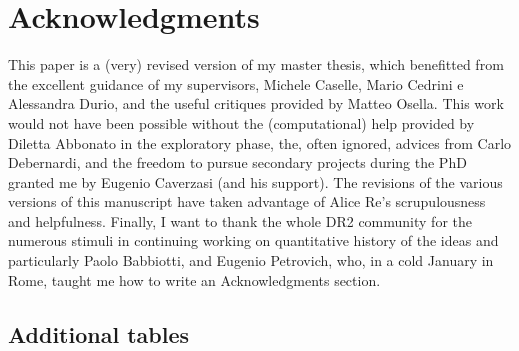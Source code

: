 \documentclass[a4paper, 11pt, headings=standardclasses, tablecaptionsbelow]{scrartcl}
\begin{document}
\section*{Acknowledgments}
This paper is a (very) revised version of my master thesis, which benefitted from the excellent guidance of my supervisors, Michele Caselle, Mario Cedrini e Alessandra Durio, and the useful critiques provided by Matteo Osella.
This work would not have been possible without the (computational) help provided by Diletta Abbonato in the exploratory phase, the, often ignored, advices from Carlo Debernardi, and the freedom to pursue secondary projects during the PhD granted me by Eugenio Caverzasi (and his support).
The revisions of the various versions of this manuscript have taken advantage of Alice Re's scrupulousness and helpfulness.
Finally, I want to thank the whole DR2 community for the numerous stimuli in continuing working on quantitative history of the ideas and particularly Paolo Babbiotti, and Eugenio Petrovich, who, in a cold January in Rome, taught me how to write an Acknowledgments section.

\clearpage
\begin{refcontext}[sorting=nyt]
  \printbibliography
\end{refcontext}
\clearpage

\begin{appendices}
  \section{Additional tables}
  \begin{landscape}
    
  \end{landscape}

\end{appendices}
\end{document}
